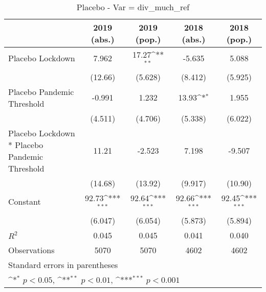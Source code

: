 \documentclass{article}
\begin{document}
{
\def\sym#1{\ifmmode^{#1}\else\(^{#1}\)\fi}
\begin{longtable}{l*{4}{c}}
\caption{Placebo - Var = div\_much\_ref}\\
\hline\hline\endfirsthead\hline\endhead\hline\endfoot\endlastfoot
                &\multicolumn{1}{c}{2019 (abs.)}&\multicolumn{1}{c}{2019 (pop.)}&\multicolumn{1}{c}{2018 (abs.)}&\multicolumn{1}{c}{2018 (pop.)}\\
\hline
Placebo Lockdown&    7.962         &    17.27\sym{**} &   -5.635         &    5.088         \\
                &  (12.66)         &  (5.628)         &  (8.412)         &  (5.925)         \\
Placebo Pandemic Threshold&   -0.991         &    1.232         &    13.93\sym{*}  &    1.955         \\
                &  (4.511)         &  (4.706)         &  (5.338)         &  (6.022)         \\
Placebo Lockdown * Placebo Pandemic Threshold&    11.21         &   -2.523         &    7.198         &   -9.507         \\
                &  (14.68)         &  (13.92)         &  (9.917)         &  (10.90)         \\
Constant        &    92.73\sym{***}&    92.64\sym{***}&    92.66\sym{***}&    92.45\sym{***}\\
                &  (6.047)         &  (6.054)         &  (5.873)         &  (5.894)         \\
\hline
\(R^{2}\)       &    0.045         &    0.045         &    0.041         &    0.040         \\
Observations    &     5070         &     5070         &     4602         &     4602         \\
\hline\hline
\multicolumn{5}{l}{\footnotesize Standard errors in parentheses}\\
\multicolumn{5}{l}{\footnotesize \sym{*} \(p<0.05\), \sym{**} \(p<0.01\), \sym{***} \(p<0.001\)}\\
\end{longtable}
}
\end{document}
